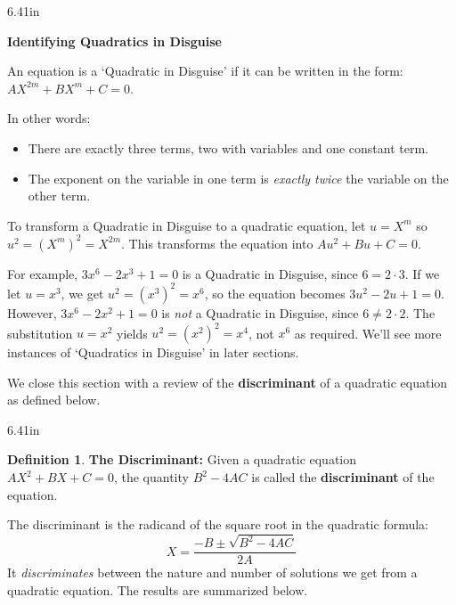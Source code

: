 \documentclass[11pt]{article}
\theoremstyle{definition}  %
\newtheorem{defn}{\bf Definition}
\newcommand{\bbm}{\begin{boxedminipage}{6.41in}}
\newcommand{\ebm}{\end{boxedminipage}}
\begin{document}
\label{QuadinDisguise}
\colorbox{ResultColor}{\bbm

\centerline{\textbf{Identifying Quadratics in Disguise}}

An equation is a `Quadratic in Disguise' if it can be written in the form:  $AX^{2m} + BX^{m} + C = 0$.  

In other words:

\begin{itemize}

\item There are exactly three terms, two with variables and one constant term.

\item  The exponent on the variable in one term is \textit{exactly twice} the variable on the other term.

\end{itemize}

To transform a Quadratic in Disguise to a quadratic equation, let $u = X^m$ so $u^2 = (X^m)^2 = X^{2m}$. This transforms the equation into $Au^2 + Bu + C = 0$.

\ebm}

\medskip

For example, $3x^6 - 2x^3 + 1 = 0$ is a Quadratic in Disguise, since $6 = 2 \cdot 3$.  If we let $u = x^3$, we get $u^2 = (x^3)^2 = x^6$, so the equation becomes $3u^2 - 2u + 1 = 0$.  However, $3x^6 - 2x^2 + 1 = 0$ is \textit{not} a Quadratic in Disguise, since $6 \neq 2\cdot 2$. The substitution $u = x^2$ yields $u^2 = (x^2)^2 = x^4$, not $x^6$ as required.  We'll see more instances of `Quadratics in Disguise' in later sections.

\medskip

We close this section with a review of the \textbf{discriminant} of a quadratic equation as defined below.

\medskip

\colorbox{ResultColor}{\bbm
\begin{defn} \textbf{The Discriminant:} Given a quadratic equation $AX^2 + BX + C = 0$, the quantity $B^2 - 4AC$ is called the \textbf{discriminant} of the equation.

\end{defn}
\ebm}

\medskip

The discriminant is the radicand of the square root in the quadratic formula:  \[X  = \dfrac{-B \pm \sqrt{B^2 - 4AC}}{2A} \] It \textit{discriminates} between the nature and number of solutions we get from a quadratic equation.   The results are summarized below. 
\end{document}
